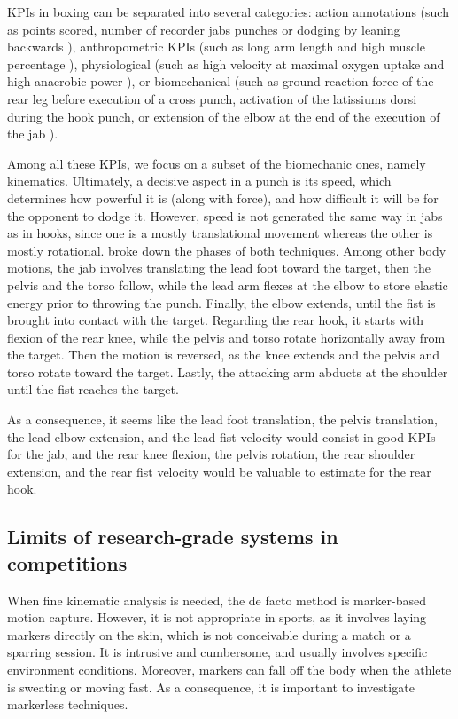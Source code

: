 KPIs in boxing can be separated into several categories: action annotations (such as points scored, number of recorder jabs punches or dodging by leaning backwards \cite{Thomson2013}), anthropometric KPIs (such as long arm length and high muscle percentage \cite{Chaabene2015}), physiological (such as high velocity at maximal oxygen uptake and high anaerobic power \cite{Chaabene2015}), or biomechanical (such as ground reaction force of the rear leg before execution of a cross punch, activation of the latissiums dorsi during the hook punch, or extension of the elbow at the end of the execution of the jab \cite{Lenetsky2020}). 

Among all these KPIs, we focus on a subset of the biomechanic ones, namely kinematics. Ultimately, a decisive aspect in a punch is its speed, which determines how powerful it is (along with force), and how difficult it will be for the opponent to dodge it. However, speed is not generated the same way in jabs as in hooks, since one is a mostly translational movement whereas the other is mostly rotational. \cite{Lenetsky2020} broke down the phases of both techniques. Among other body motions, the jab involves translating the lead foot toward the target, then the pelvis and the torso follow, while the lead arm flexes at the elbow to store elastic energy prior to throwing the punch. Finally, the elbow extends, until the fist is brought into contact with the target. Regarding the rear hook, it starts with flexion of the rear knee, while the pelvis and torso rotate horizontally away from the target. Then the motion is reversed, as the knee extends and the pelvis and torso rotate toward the target. Lastly, the attacking arm abducts at the shoulder until the fist reaches the target. 

As a consequence, it seems like the lead foot translation, the pelvis translation, the lead elbow extension, and the lead fist velocity would consist in good KPIs for the jab, and the rear knee flexion, the pelvis rotation, the rear shoulder extension, and the rear fist velocity would be valuable to estimate for the rear hook.


\subsection{Limits of research-grade systems in competitions}

When fine kinematic analysis is needed, the de facto method is marker-based motion capture. However, it is not appropriate in sports, as it involves laying markers directly on the skin, which is not conceivable during a match or a sparring session. It is intrusive and cumbersome, and usually involves specific environment conditions. Moreover, markers can fall off the body when the athlete is sweating or moving fast. As a consequence, it is important to investigate markerless techniques. 

